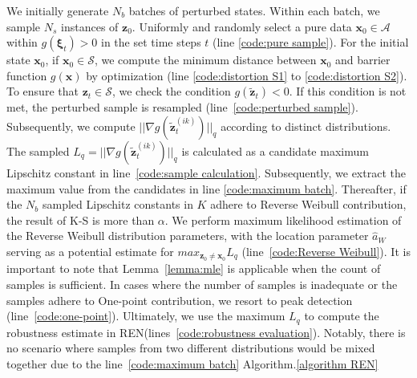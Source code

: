 \documentclass[conference]{IEEEtran}
\newcommand{\ren}{\textsc{REN}\xspace}
\newcommand{\myvec}[1]{\boldsymbol{#1}}
\newcommand{\calA}{\mathcal{A}}
\newcommand{\calS}{\mathcal{S}}
\begin{document}
We initially generate $N_{b}$ batches 
of perturbed states. 
Within each batch, we sample $N_{s}$ instances of 
$\myvec{z}_{0}$. 
Uniformly and randomly select a pure data 
$\myvec{x}_{0} \in \calA$ within 
$g(\myvec{\xi}_{t}) > 0$ 
in the set time steps $t$ (line \ref{code:pure sample}). 
For the initial state $\myvec{x}_{0}$, 
if $\myvec{x}_{0} \in \calS$, we compute the minimum distance 
between $\myvec{x}_{0}$ and barrier function $g(\myvec{x})$ 
by optimization 
(line \ref{code:distortion S1} to \ref{code:distortion S2}). 
To ensure that 
$\myvec{z}_{t} \in \calS$, 
we check the condition 
$g(\tilde{\myvec{z}}_{t}) < 0$. 
If this condition is not met, the perturbed sample is 
resampled (line~\ref{code:perturbed sample}). 
Subsequently, we compute 
$||\nabla g(\tilde{\myvec{z}}_{t}^{(ik)})||_{q}$ 
according to distinct distributions. 
The sampled $L_q = ||\nabla 
g(\tilde{\myvec{z}}_{t}^{(ik)})||_{q}$ 
is calculated as a candidate 
maximum Lipschitz constant in 
line~\ref{code:sample calculation}. 
Subsequently, we extract the maximum value from 
the candidates in line \ref{code:maximum batch}. 
Thereafter, if the $N_b$ sampled Lipschitz constants in $K$ 
adhere to Reverse Weibull contribution, the result 
of K-S is more than $\alpha$. 
We perform maximum likelihood 
estimation of the Reverse Weibull distribution 
parameters, with the location parameter 
$\hat{a}_{W}$ serving as a potential estimate 
for $max_{\myvec{z}_{0}\neq\myvec{x}_{0}}L_{q}$ 
(line~\ref{code:Reverse Weibull}). It is important to 
note that Lemma~\ref{lemma:mle} is applicable when 
the count of samples is sufficient. In cases 
where the number of samples is inadequate 
or the samples adhere to One-point contribution, 
we resort to peak detection 
(line~\ref{code:one-point}). 
Ultimately, we use 
the maximum $L_q$ to compute the robustness 
estimate in \ren (lines~\ref{code:robustness evaluation}). 
Notably, there is no scenario where 
samples from two different distributions 
would be mixed together due to 
the line~\ref{code:maximum batch} Algorithm.\ref{algorithm REN}
\end{document}
